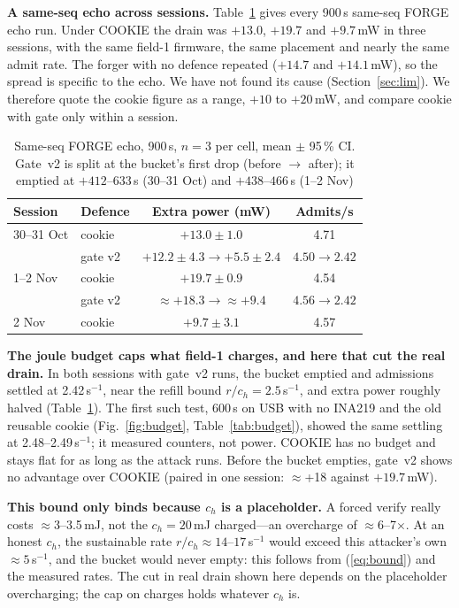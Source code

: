 \documentclass[conference]{IEEEtran}
\begin{document}
\textbf{A same-seq echo across sessions.} Table~\ref{tab:echo} gives every 900\,s same-seq FORGE echo run. Under
COOKIE the drain was $+13.0$, $+19.7$ and $+9.7$\,mW in three sessions, with the same field-1 firmware, the same
placement and nearly the same admit rate. The forger with no defence repeated ($+14.7$ and $+14.1$\,mW), so the
spread is specific to the echo. We have not found its cause (Section~\ref{sec:lim}). We therefore quote the cookie
figure as a range, $+10$ to $+20$\,mW, and compare cookie with gate only within a session.

\begin{table}[t]
\caption{Same-seq FORGE echo, 900\,s, $n=3$ per cell, mean $\pm$ 95\,\% CI. Gate~v2 is split at the
bucket's first drop (before $\to$ after); it emptied at $+412$--$633$\,s (30--31 Oct) and $+438$--$466$\,s
(1--2 Nov)}
\label{tab:echo}
\centering\footnotesize
\setlength{\tabcolsep}{3pt}
\begin{tabular}{llcc}
\toprule
Session & Defence & Extra power (mW) & Admits/s\\
\midrule
30--31 Oct & cookie & $+13.0\pm1.0$ & 4.71\\
 & gate v2 & $+12.2\pm4.3\to+5.5\pm2.4$ & $4.50\to2.42$\\
1--2 Nov & cookie & $+19.7\pm0.9$ & 4.54\\
 & gate v2 & $\approx+18.3\to\approx+9.4$ & $4.56\to2.42$\\
2 Nov & cookie & $+9.7\pm3.1$ & 4.57\\
\bottomrule
\end{tabular}
\end{table}

\textbf{The joule budget caps what field-1 charges, and here that cut the real drain.} In both sessions with gate~v2
runs, the bucket emptied and admissions settled at 2.42\,s$^{-1}$, near the refill bound $r/c_h=2.5$\,s$^{-1}$, and
extra power roughly halved (Table~\ref{tab:echo}). The first such test, 600\,s on USB with no INA219 and the old
reusable cookie (Fig.~\ref{fig:budget}, Table~\ref{tab:budget}), showed the same settling at 2.48--2.49\,s$^{-1}$;
it measured counters, not power. COOKIE has no budget and stays flat for as long as the attack runs. Before the
bucket empties, gate~v2 shows no advantage over COOKIE (paired in one session: $\approx$+18 against
$+19.7$\,mW).

\textbf{This bound only binds because $c_h$ is a placeholder.} A forced verify really costs $\approx$3--3.5\,mJ,
not the $c_h=20$\,mJ charged---an overcharge of $\approx$6--7$\times$. At an honest $c_h$, the sustainable rate
$r/c_h\approx14$--$17$\,s$^{-1}$ would exceed this attacker's own $\approx5$\,s$^{-1}$, and the bucket would never
empty: this follows from (\ref{eq:bound}) and the measured rates. The cut in real drain shown here depends on the
placeholder overcharging; the cap on charges holds whatever $c_h$ is.
\end{document}
